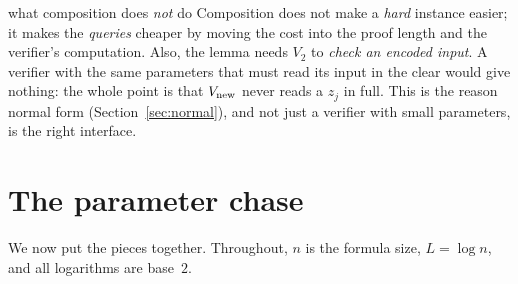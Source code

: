 \begin{pitfall}{what composition does \emph{not} do}
Composition does not make a \emph{hard} instance easier; it makes the \emph{queries} cheaper by moving the cost into the proof length and the verifier's computation.
Also, the lemma needs $V_2$ to \emph{check an encoded input}.  A verifier with the same parameters that must read its input in the clear would give nothing: the whole point is that $V_{\rm new}$ never reads a $z_j$ in full.
This is the reason normal form (Section~\ref{sec:normal}), and not just a verifier with small parameters, is the right interface.
\end{pitfall}


\section{The parameter chase}
\label{sec:chase}

We now put the pieces together.  Throughout, $n$ is the formula size, $L=\log n$, and all logarithms are base~$2$.

